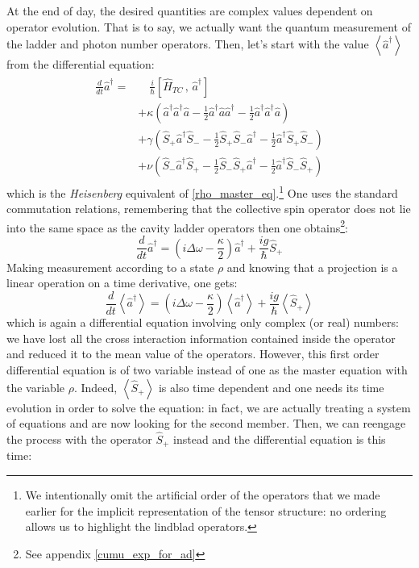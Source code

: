 \documentclass[10pt]{report}
\begin{document}
At the end of day, the desired quantities are complex values dependent on operator evolution. That is to say, we actually want the quantum measurement of the ladder and photon number operators. Then, let's start with the value $\left\langle\hat{a}^\dagger\right\rangle$ from the differential equation:
\begin{align}
\label{dtad_rough}
\begin{split}
\frac{d}{dt}\hat{a}^\dagger = &\quad\frac{i}{\hbar}\left[ \hat{H}_{TC}\, , \, \hat{a}^\dagger \right]\\
&+ \kappa \left( \hat{a}^\dagger \hat{a}^\dagger \hat{a} - \frac{1}{2} \hat{a}^\dagger \hat{a} \hat{a}^\dagger - \frac{1}{2} \hat{a}^\dagger \hat{a}^\dagger \hat{a} \right)\\
&+ \gamma \left( \hat{S}_+ \hat{a}^\dagger \hat{S}_- - \frac{1}{2} \hat{S}_+ \hat{S}_- \hat{a}^\dagger - \frac{1}{2} \hat{a}^\dagger \hat{S}_+ \hat{S}_- \right)\\
&+ \nu \left( \hat{S}_- \hat{a}^\dagger \hat{S}_+ - \frac{1}{2} \hat{S}_- \hat{S}_+ \hat{a}^\dagger - \frac{1}{2} \hat{a}^\dagger \hat{S}_- \hat{S}_+ \right)
\end{split}
\end{align}
which is the \textit{Heisenberg} equivalent of \eqref{rho_master_eq}.\footnote{We intentionally omit the artificial order of the operators that we made earlier for the implicit representation of the tensor structure: no ordering allows us to highlight the lindblad operators.} One uses the standard commutation relations, remembering that the collective spin operator does not lie into the same space as the cavity ladder operators then one obtains\footnote{See appendix \ref{cumu_exp_for_ad}}:
\begin{equation}
\label{ad_pure}
\frac{d}{dt}\hat{a}^\dagger = \left(i\Delta\omega - \frac{\kappa}{2} \right) \hat{a}^\dagger + \frac{ig}{\hbar} \hat{S}_+
\end{equation}
Making measurement according to a state $\rho$ and knowing that a projection is a linear operation on a time derivative, one gets:
\begin{equation}
\label{ad_mean_field}
\frac{d}{dt}\left\langle\hat{a}^\dagger\right\rangle = \left(i\Delta\omega - \frac{\kappa}{2} \right) \left\langle\hat{a}^\dagger\right\rangle + \frac{ig}{\hbar} \left\langle\hat{S}_+\right\rangle
\end{equation}
which is again a differential equation involving only complex (or real) numbers: we have lost all the cross interaction information contained inside the operator and reduced it to the mean value of the operators. However, this first order differential equation is of two variable instead of one as the master equation with the variable $\rho$. Indeed, $\left\langle\hat{S}_+\right\rangle$ is also time dependent and one needs its time evolution in order to solve the equation: in fact, we are actually treating a system of equations and are now looking for the second member. Then, we can reengage the process with the operator $\hat{S}_+$ instead and the differential equation is this time:
\end{document}
